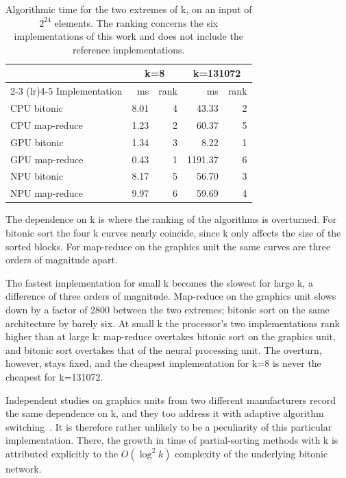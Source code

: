 \begin{table}[H]
    \centering
    \begin{tabular}{lrrrr}
        \toprule
        & \multicolumn{2}{c}{k=8} & \multicolumn{2}{c}{k=131072} \\
        \cmidrule(lr){2-3} \cmidrule(lr){4-5}
        Implementation & ms & rank & ms & rank \\
        \midrule
        CPU bitonic & 8.01 & 4 & 43.33 & 2 \\
        CPU map-reduce & 1.23 & 2 & 60.37 & 5 \\
        GPU bitonic & 1.34 & 3 & 8.22 & 1 \\
        GPU map-reduce & 0.43 & 1 & 1191.37 & 6 \\
        NPU bitonic & 8.17 & 5 & 56.70 & 3 \\
        NPU map-reduce & 9.97 & 6 & 59.69 & 4 \\
        \bottomrule
    \end{tabular}
    \caption[Algorithmic time for the two extremes of k]{Algorithmic time for
    the two extremes of k, on an input of $2^{24}$ elements. The ranking
    concerns the six implementations of this work and does not include the
    reference implementations.}
    \label{tab:eval-k-inversion}
\end{table}

The dependence on k is where the ranking of the algorithms is overturned. For
bitonic sort the four k curves nearly coincide, since k only affects the size
of the sorted blocks. For map-reduce on the graphics unit the same curves are
three orders of magnitude apart.

The fastest implementation for small k becomes the slowest for large k, a
difference of three orders of magnitude. Map-reduce on the graphics unit slows
down by a factor of 2800 between the two extremes; bitonic sort on the same
architecture by barely six. At small k the processor's two implementations rank
higher than at large k: map-reduce overtakes bitonic sort on the graphics unit,
and bitonic sort overtakes that of the neural processing unit. The overturn,
however, stays fixed, and the cheapest implementation for k=8 is never the
cheapest for k=131072.

Independent studies on graphics units from two different manufacturers record
the same dependence on k, and they too address it with adaptive algorithm
switching~\cite{zhang2023gputopk,lin2026adaptivetopk}. It is therefore rather
unlikely to be a peculiarity of this particular implementation. There, the
growth in time of partial-sorting methods with k is attributed explicitly to
the $O(\log^2 k)$ complexity of the underlying bitonic network.

